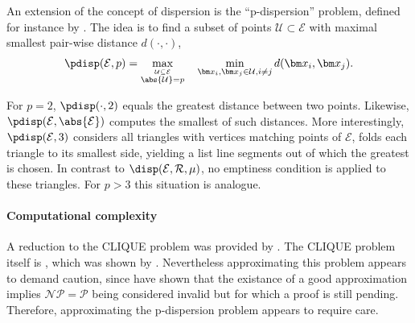 %
An extension of the concept of dispersion is the \enquote{p-dispersion} problem, defined for instance by . The idea is to find a subset of points $\mathcal U \subset \mathcal E$ with maximal smallest pair-wise distance $d(\cdot,\cdot)$,
\begin{align}\label{eq:pdisp}
  \pdisp(\mathcal E, p) = \max_{\stackrel{\mathcal U \subseteq \mathcal E}{\abs{\mathcal U} = p}} \quad\min_{\bm x_i, \bm x_j \in \mathcal U, i \neq j} d(\bm x_i, \bm x_j).
\end{align}

For $p=2$, $\pdisp(\cdot,2)$ equals the greatest distance between two points. Likewise, $\pdisp(\mathcal E, \abs{\mathcal E})$ computes the smallest of such distances. More interestingly, $\pdisp(\mathcal E,3)$ considers all triangles with vertices matching points of $\mathcal E$, folds each triangle to its smallest side, yielding a list line segments out of which the greatest is chosen. In contrast to $\disp(\mathcal E, \mathcal R, \mu)$, no emptiness condition is applied to these triangles. For $p>3$ this situation is analogue.

\paragraph{Computational complexity}

A reduction to the CLIQUE problem was provided by . The CLIQUE problem itself is \ccNPcomplete, which was shown by . Nevertheless approximating this problem appears to demand caution, since  have shown that the existance of a good approximation implies $\mathcal{NP} = \mathcal{P}$ being considered invalid but for which a proof is still pending. Therefore, approximating the p-dispersion problem appears to require care.
